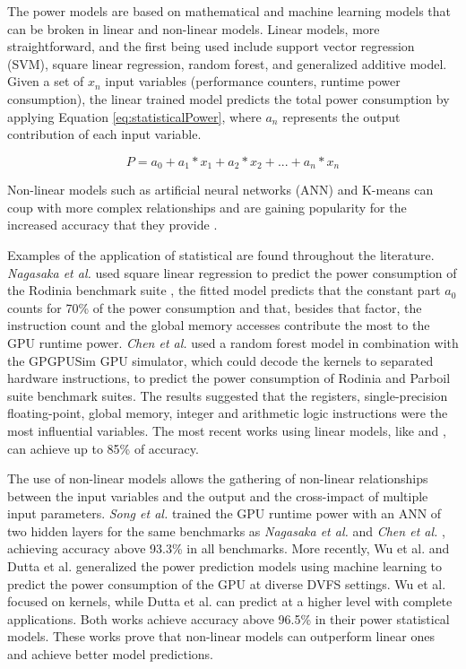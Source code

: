 The power models are based on mathematical and machine learning models that can be broken in linear and non-linear models. Linear models, more straightforward, and the first being used include support vector regression (SVM), square linear regression, random forest, and generalized additive model.
Given a set of $x_n$ input variables (performance counters, runtime power consumption), the linear trained model predicts the total power consumption by applying Equation \ref{eq:statisticalPower}, where $a_n$ represents the output contribution of each input variable.

\begin{equation}
\label{eq:statisticalPower}
    P = a_0 + a_1 * x_1 + a_2 * x_2 + ... + a_n * x_n
\end{equation}

Non-linear models such as artificial neural networks (ANN) and K-means can coup with more complex relationships and are gaining popularity for the increased accuracy that they provide \cite{mei_survey_2016}. 

Examples of the application of statistical are found throughout the literature. \textit{Nagasaka et al.} \cite{nagasaka_statistical_2010} used square linear regression to predict the power consumption of the Rodinia benchmark suite \cite{che_rodinia:_2009}, the fitted model predicts that the constant part $a_0$ counts for 70\% of the power consumption and that, besides that factor, the instruction count and the global memory accesses contribute the most to the GPU runtime power.  \textit{Chen et al.} \cite{chen_statistical_2011} used a random forest model in combination with the GPGPUSim GPU simulator, which could decode the kernels to separated hardware instructions, to predict the power consumption of Rodinia \cite{che_rodinia:_2009} and Parboil suite \cite{stratton_parboil:_nodate} benchmark suites. The results suggested that the registers, single-precision floating-point, global memory, integer and arithmetic logic instructions were the most influential variables. The most recent works using linear models, like \cite{abe_power_2014} and \cite{ghosh_statistical_2013}, can achieve up to 85\% of accuracy.

The use of non-linear models allows the gathering of non-linear relationships between the input variables and the output and the cross-impact of multiple input parameters. \textit{Song et al.} \cite{song_simplified_2013} trained the GPU runtime power with an ANN of two hidden layers for the same benchmarks as \textit{Nagasaka et al.} \cite{nagasaka_statistical_2010} and \textit{Chen et al.} \cite{chen_statistical_2011}, achieving accuracy above 93.3\% in all benchmarks. More recently, Wu et al. \cite{wu_gpgpu_2015} and Dutta et al. \cite{dutta_gpu_2018} generalized the power prediction models using machine learning to predict the power consumption of the GPU at diverse DVFS settings. Wu et al. focused on kernels, while Dutta et al. can predict at a higher level with complete applications. Both works achieve accuracy above 96.5\% in their power statistical models. These works prove that non-linear models can outperform linear ones and achieve better model predictions.

